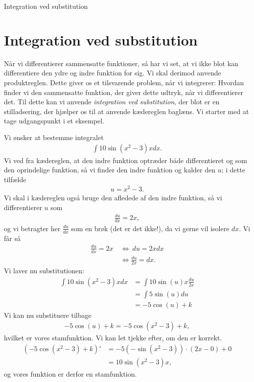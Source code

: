 

\begin{center}
\Huge
Integration ved substitution
\end{center}

\section*{Integration ved substitution}

Når vi differentierer sammensatte funktioner, så har vi set, at vi ikke blot kan differentiere den ydre og indre funktion for sig. Vi skal derimod anvende produktreglen. Dette giver os et tilsvarende problem, når vi integrerer: Hvordan finder vi den sammensatte funktion, der giver dette udtryk, når vi differentierer det. Til dette kan vi anvende \textit{integration ved substitution}, der blot er en stilladsering, der hjælper os til at anvende kædereglen baglæns. 
Vi starter med at tage udgangspunkt i et eksempel.
\begin{exa}
	Vi ønsker at bestemme integralet
	\begin{align*}
		\int 10\sin(x^2-3)x dx.
	\end{align*}
	Vi ved fra kædereglen, at den indre funktion optræder både differentieret og som den oprindelige funktion, så vi 
	finder den indre funktion og kalder den $u$; i dette tilfælde
	\begin{align*}
		u = x^2 - 3.
	\end{align*}
	Vi skal i kædereglen også bruge den afledede af den indre funktion, så vi differentierer $u$ som
	\begin{align*}
		\frac{du}{dx} = 2x,
	\end{align*}
	og vi betragter her $\frac{du}{dx}$ som en brøk (det er det ikke!), da vi gerne vil isolere $dx$. Vi får så
	\begin{align*}
		\frac{du}{dx} = 2x &\ \Leftrightarrow \ du = 2xdx\\
		&\ \Leftrightarrow \frac{du}{2x} = dx.
	\end{align*}
	Vi laver nu substitutionen:
	\begin{align*}
		\int 10\sin(x^2-3)x dx &= \int 10 \sin(u) x \frac{du}{2x} \\
		&= \int 5\sin(u) du\\
		&= -5\cos(u) + k
	\end{align*}
	Vi kan nu substituere tilbage
	\begin{align*}
		-5\cos(u) + k = -5\cos(x^2 - 3) + k,
	\end{align*}
	hvilket er vores stamfunktion. Vi kan let tjekke efter, om den er korrekt.
	\begin{align*}
		\left(-5\cos(x^2-3) + k \right)' &= -5(-\sin(x^2-3))\cdot(2x - 0) + 0\\
		&= 10\sin(x^2-3)x,
	\end{align*}
	og vores funktion er derfor en stamfunktion. 
\end{exa}
